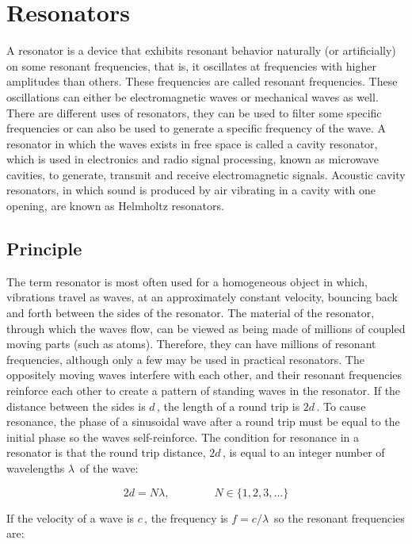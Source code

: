 \section{Resonators}
\normalfont \large A resonator is a device that exhibits resonant behavior naturally (or artificially) on some resonant frequencies, that is, it oscillates at frequencies with higher amplitudes than others. These frequencies are called resonant frequencies. These oscillations can either be electromagnetic waves or mechanical waves as well. There are different uses of resonators, they can be used to filter some specific frequencies or can also be used to generate a specific frequency of the wave. A resonator in which the waves exists in free space is called a cavity resonator, which is used in electronics and radio signal processing, known as microwave cavities, to generate, transmit and receive electromagnetic signals. Acoustic cavity resonators, in which sound is produced by air vibrating in a cavity with one opening, are known as Helmholtz resonators.
\subsection{Principle}
The term resonator is most often used for a homogeneous object in which, vibrations travel as waves, at an approximately constant velocity, bouncing back and forth between the sides of the resonator. The material of the resonator, through which the waves flow, can be viewed as being made of millions of coupled moving parts (such as atoms). Therefore, they can have millions of resonant frequencies, although only a few may be used in practical resonators. The oppositely moving waves interfere with each other, and their resonant frequencies reinforce each other to create a pattern of standing waves in the resonator. If the distance between the sides is ${\displaystyle d\,}$, the length of a round trip is ${\displaystyle 2d\,}$. To cause resonance, the phase of a sinusoidal wave after a round trip must be equal to the initial phase so the waves self-reinforce. The condition for resonance in a resonator is that the round trip distance, ${\displaystyle 2d\,}$, is equal to an integer number of wavelengths ${\displaystyle \lambda \,}$ of the wave:

$${\displaystyle 2d=N\lambda ,\qquad \qquad N\in \{1,2,3,\dots \}}$$

If the velocity of a wave is ${\displaystyle c\,}$, the frequency is ${\displaystyle f=c/\lambda \,}$ so the resonant frequencies are:

